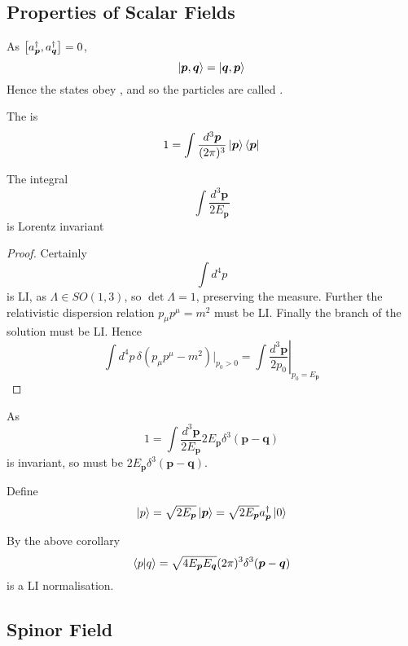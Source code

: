 \documentclass{article}
\begin{document}
\subsection{Properties of Scalar Fields}

\begin{theorem}
As $\comm[a_{\bm{p}}^\dagger]{a_{\bm{q}}^\dagger}=0$,
\[
\ket{\bm{p},\bm{q}}=\ket{\bm{q},\bm{p}}
\]
Hence the states obey , and so the particles are called .
\end{theorem}


\begin{definition}
The  is 
\[
1=\int \tmeas \ket{\bm{p}}\bra{\bm{p}}
\]
\end{definition}

\begin{theorem}
The integral 
\[
\int \frac{d^3 \bm{p}}{2E_{\bm{p}}}
\]
is Lorentz invariant
\end{theorem}
\begin{proof}
Certainly 
\[
\int d^4 p 
\]
is LI, as $\Lambda\in SO(1,3)$, so $\det\Lambda=1$, preserving the measure. Further the relativistic dispersion relation $p_\mu p^\mu=m^2$ must be LI. Finally the branch of the solution must be LI. Hence 
\[
\int d^4p \, \delta(p_\mu p^\mu-m^2)|_{p_0>0} = \int \left. \frac{d^3\bm{p}}{2p_0} \right|_{p_0=E_{\bm{p}}}
\]
\end{proof}

\begin{corollary}
As 
\[
1=\int \frac{d^3 \bm{p}}{2E_{\bm{p}}} 2E_{\bm{p}} \delta^3(\bm{p}-\bm{q})
\]
is invariant, so must be $2E_{\bm{p}} \delta^3(\bm{p}-\bm{q})$.
\end{corollary}

\begin{definition}
Define 
\[
\ket{p}=\sqrt{2E_{\bm{p}}}\ket{\bm{p}}=\sqrt{2E_{\bm{p}}}a_{\bm{p}}^\dagger \ket{0}
\]
\end{definition}

\begin{idea}
By the above corollary 
\[
\braket{p|q}=\sqrt{4E_{\bm{p}}E_{\bm{q}}}(2\pi)^3 \delta^3(\bm{p}-\bm{q})
\]
is a LI normalisation. 
\end{idea}

\subsection{Spinor Field}
\end{document}
